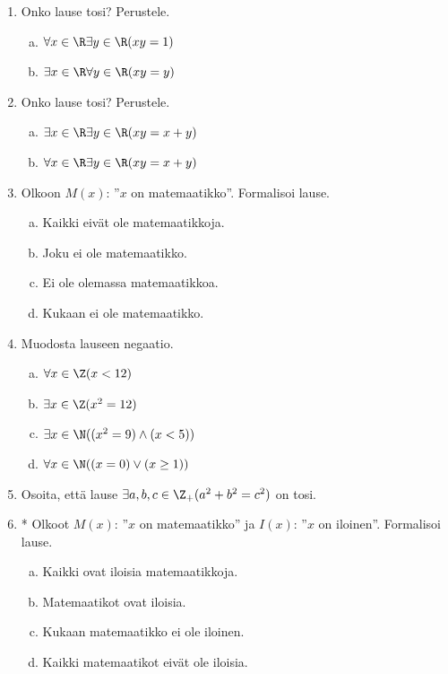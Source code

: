 \begin{enumerate}
\item Onko lause tosi? Perustele.
\begin{enumerate}[a)]
\item $\forall x\in \R\exists y\in \R (xy=1)$
\item $\exists x\in \R\forall y\in \R (xy=y)$
\end{enumerate}

\item Onko lause tosi? Perustele. %
\begin{enumerate}[a)]
\item $\exists x\in \R\exists y\in \R (xy=x+y)$
\item $\forall x\in \R\exists y\in \R (xy=x+y)$
\end{enumerate}

\newpage

\item Olkoon $M(x)$: ''$x$ on matemaatikko''. Formalisoi lause.

\begin{enumerate}[a)]
\item Kaikki eivät ole matemaatikkoja.
\item Joku ei ole matemaatikko.
\item Ei ole olemassa matemaatikkoa.
\item Kukaan ei ole matemaatikko.
\end{enumerate}

\item
Muodosta lauseen negaatio.
\begin{enumerate}[a)]
\item $\forall x\in \Z (x < 12)$
\item $\exists x\in \Z (x^2 = 12)$
\item $\exists x\in \N ((x^2=9) \land (x<5))$
\item $\forall x\in \N ((x=0)\lor (x\ge 1))$
\end{enumerate}

\item Osoita, että lause $\exists a, b, c \in \Z_{+} (a^2 + b^2 =
c^2)$ on tosi.

\item * %
Olkoot $M(x)$: ''$x$ on matemaatikko'' ja
$I(x)$: ''$x$ on iloinen''. Formalisoi lause.
\begin{enumerate}[a)]
\item Kaikki ovat iloisia matemaatikkoja.
\item Matemaatikot ovat iloisia.
\item Kukaan matemaatikko ei ole iloinen.
\item Kaikki matemaatikot eivät ole iloisia.
\end{enumerate}


\end{enumerate}

